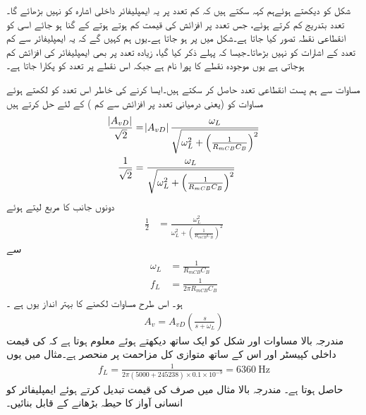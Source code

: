 شکل کو دیکھتے ہوئےہم کہہ سکتے ہیں کہ کم تعدد پر یہ ایمپلیفائر داخلی اشارہ کو نہیں بڑھائے گا۔تعدد بتدریج کم کرتے ہوئے، جس تعدد پر افزائش کی قیمت کم ہوتے ہوتے  کے  گنا ہو جائے اسی کو انقطاعی نقطہ  تصور کیا جاتا ہے۔شکل   میں  پر  ہو جاتا ہے۔یوں ہم کہیں گے کہ یہ ایمپلیفائر   سے کم تعدد کے اشارات کو نہیں بڑھاتا۔جیسا کہ پہلے ذکر کیا گیا، زیادہ تعدد پر بھی ایمپلیفائر کی افزائش کم ہوجاتی ہے یوں موجودہ نقطے کا پورا نام  ہے جبکہ اس نقطے پر تعدد  کو   پکارا جاتا ہے۔


مساوات  سے ہم پست انقطاعی تعدد حاصل کر سکتے ہیں۔ایسا کرنے کی خاطر اس تعدد کو  لکھتے ہوئے مساوات کو  (یعنی درمیانی تعدد پر افزائش سے   کم ) کے لئے حل کرتے ہیں
\begin{align*}
\frac{\abs{A_{vD}}}{\sqrt{2}} &=\abs{A_{vD}} \frac{\omega_L}{\sqrt{\omega_L^2 +\left(\frac{1}{R_{mCB} C_B} \right )^2}}\\
\frac{1}{\sqrt{2}}&= \frac{\omega_L}{\sqrt{\omega_L^2 +\left(\frac{1}{R_{mCB} C_B} \right )^2}}
\end{align*}
دونوں جانب کا مربع لیتے ہوئے
\begin{align*}
\frac{1}{2}&= \frac{\omega_L^2}{\omega_L^2 +\left(\frac{1}{R_{mCB} C_B} \right )^2}
\end{align*}
سے
\begin{gather} \label{مساوات_تعددی_ردعمل_قابو_کپیسٹر_پست_انقطاعی_تعدد}
\begin{aligned}
\omega_L &= \frac{1}{R_{mCB} C_B}\\
f_L&=\frac{1}{2 \pi  R_{mCB} C_B}
\end{aligned}
\end{gather}
ہو۔ اس طرح مساوات   لکھنے کا بہتر انداز یوں ہے ۔
\begin{align} \label{مساوات_تعددی_ردعمل_قابو_کپیسٹر_معیاری_مساوات}
A_v=A_{vD} \left(\frac{s}{s+\omega_L} \right )
\end{align}
مندرجہ بالا مساوات اور شکل   کو ایک ساتھ دیکھتے ہوئے معلوم ہوتا ہے کہ   کی قیمت داخلی کپیسٹر   اور اس کے ساتھ متوازی کل مزاحمت   پر منحصر ہے۔مثال   میں یوں
\begin{align*}
f_L=\frac{1}{2 \pi \left(5000+245238 \right ) \times 0.1 \times 10^{-9}  }=\SI{6360}{\hertz}
\end{align*}
حاصل ہوتا ہے۔
مندرجہ بالا مثال  میں صرف کی قیمت تبدیل کرتے ہوئے ایمپلیفائر کو انسانی آواز کا حیطہ بڑھانے کے قابل بنائیں۔

